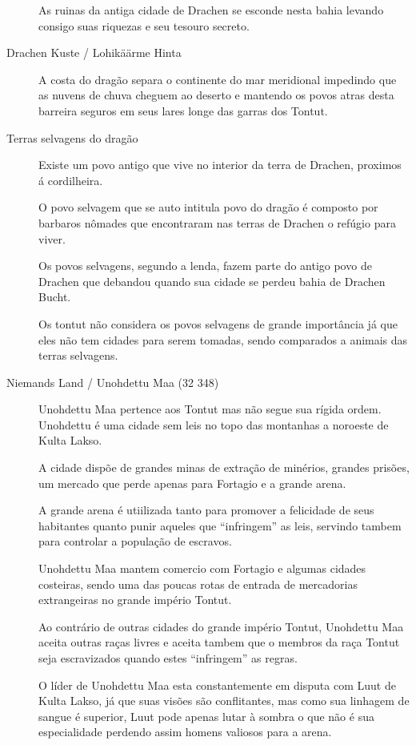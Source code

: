 \begin{description}
As ruinas da antiga cidade de Drachen se esconde nesta bahia
levando consigo suas riquezas e seu tesouro secreto.

\item[Drachen Kuste / Lohik\"a\"arme Hinta]
A costa do drag\~ao separa o continente do mar meridional impedindo
que as nuvens de chuva cheguem ao deserto e mantendo os povos
atras desta barreira seguros em seus lares longe das garras dos Tontut.

\item[Terras selvagens do drag\~ao]
Existe um povo antigo que vive no interior da terra de Drachen, proximos
\'a cordilheira.

O povo selvagem que se auto intitula povo do drag\~ao \'e composto por
barbaros n\^omades que encontraram nas terras de Drachen o ref\'ugio para viver.

Os povos selvagens, segundo a lenda, fazem parte do antigo povo de Drachen
que debandou quando sua cidade se perdeu bahia de Drachen Bucht.

Os tontut n\~ao considera os povos selvagens de grande import\^ancia j\'a que
eles n\~ao tem cidades para serem tomadas, sendo comparados a animais
das terras selvagens.

\item[Niemands Land / Unohdettu Maa (32 348)]
Unohdettu Maa pertence aos Tontut mas n\~ao segue sua r\'igida
ordem. Unohdettu \'e uma cidade sem leis no topo das montanhas a
noroeste de Kulta Lakso.

A cidade disp\~oe de grandes minas de extra\c{c}\~ao de min\'erios, grandes
pris\~oes, um mercado que perde apenas para Fortagio e a grande arena.

A grande arena \'e utiilizada tanto para promover a felicidade de seus habitantes
quanto punir aqueles que ``infringem'' as leis, servindo tambem para controlar a
popula\c{c}\~ao de escravos.

Unohdettu Maa mantem comercio com Fortagio e algumas cidades costeiras, sendo
uma das poucas rotas de entrada de mercadorias extrangeiras no grande imp\'erio
Tontut.

Ao contr\'ario de outras cidades do grande imp\'erio Tontut, Unohdettu Maa
aceita outras ra\c{c}as livres e aceita tambem que o membros da ra\c{c}a
Tontut seja escravizados quando estes ``infringem'' as regras.

O l\'ider de Unohdettu Maa esta constantemente em disputa com Luut de
Kulta Lakso, j\'a que suas vis\~oes s\~ao conflitantes, mas como
sua linhagem de sangue \'e superior, Luut pode apenas lutar \`a
sombra o que n\~ao \'e sua especialidade perdendo assim
homens valiosos para a arena.


\end{description}
